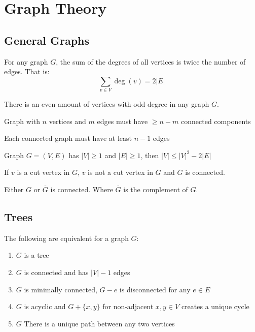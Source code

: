 \section{Graph Theory}

\subsection*{General Graphs}
\begin{lemma}
	For any graph $G$, the sum of the degrees of all vertices is twice the number of edges. That is:
	$$
	\sum_{v \in V} \deg(v) = 2|E|
	$$
\end{lemma}

\begin{theorem}
	There is an even amount of vertices with odd degree in any graph $G$.
\end{theorem}

\begin{theorem}
	Graph with $n$ vertices and $m$ edges must have $\geq n-m$ connected components
\end{theorem}

\begin{corollary}
	Each connected graph must have at least $n-1$ edges
\end{corollary}

\begin{theorem}
	Graph $G=(V,E)$ has $|V|\geq 1$ and $|E| \geq 1$, then $|V| \leq |V|^2-2|E|$
\end{theorem}

\begin{theorem}
	If $v$ is a cut vertex in $G$, $v$ is not a cut vertex in $\overline{G}$ and $\overline{G}$ is connected.
\end{theorem}

\begin{theorem}
	Either $G$ or $\overline{G}$ is connected. Where $\overline{G}$ is the complement of $G$.
\end{theorem}

\subsection*{Trees}
\begin{theorem}
	The following are equivalent for a graph $G$:
	\begin{enumerate}
		\item $G$ is a tree
		\item $G$ is connected and has $|V|-1$ edges
		\item $G$ is minimally connected, $G-e$ is disconnected for any $e\in E$
		\item $G$ is acyclic and $G+\{x,y\}$ for non-adjacent $x,y\in V$ creates a unique cycle
		\item $G$ There is a unique path between any two vertices
	\end{enumerate}
\end{theorem}

